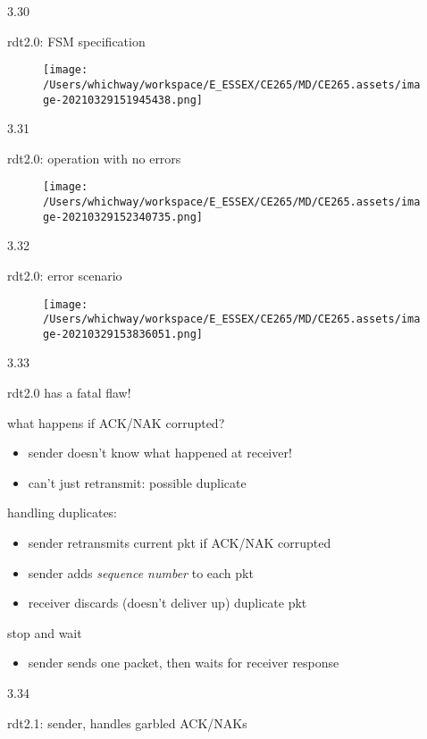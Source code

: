 \documentclass[
]{article}
\begin{document}
3.30

rdt2.0: FSM specification

\begin{figure}
\centering
\texttt{[image: /Users/whichway/workspace/E\_ESSEX/CE265/MD/CE265.assets/image-20210329151945438.png]}
\caption{}
\end{figure}

3.31

rdt2.0: operation with no errors

\begin{figure}
\centering
\texttt{[image: /Users/whichway/workspace/E\_ESSEX/CE265/MD/CE265.assets/image-20210329152340735.png]}
\caption{}
\end{figure}

3.32

rdt2.0: error scenario

\begin{figure}
\centering
\texttt{[image: /Users/whichway/workspace/E\_ESSEX/CE265/MD/CE265.assets/image-20210329153836051.png]}
\caption{}
\end{figure}

3.33

rdt2.0 has a fatal flaw!

what happens if ACK/NAK corrupted?

\begin{itemize}
\item
  sender doesn't know what happened at receiver!
\item
  can't just retransmit: possible duplicate
\end{itemize}

handling duplicates:

\begin{itemize}
\item
  sender retransmits current pkt if ACK/NAK corrupted
\item
  sender adds \emph{sequence number} to each pkt
\item
  receiver discards (doesn't deliver up) duplicate pkt
\end{itemize}

stop and wait

\begin{itemize}
\item
  sender sends one packet, then waits for receiver response
\end{itemize}

3.34

rdt2.1: sender, handles garbled ACK/NAKs
\end{document}
